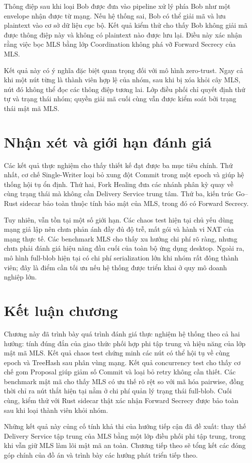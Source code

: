 \documentclass[../DoAn.tex]{subfiles}
\begin{document}
	Thông điệp sau khi loại Bob được đưa vào pipeline xử lý phía Bob như một envelope nhận được từ mạng. Nếu hệ thống sai, Bob có thể giải mã và lưu plaintext vào cơ sở dữ liệu cục bộ. Kết quả kiểm thử cho thấy Bob không giải mã được thông điệp này và không có plaintext nào được lưu lại. Điều này xác nhận rằng việc bọc MLS bằng lớp Coordination không phá vỡ Forward Secrecy của MLS.
	
	Kết quả này có ý nghĩa đặc biệt quan trọng đối với mô hình zero-trust. Ngay cả khi một nút từng là thành viên hợp lệ của nhóm, sau khi bị xóa khỏi cây MLS, nút đó không thể đọc các thông điệp tương lai. Lớp điều phối chỉ quyết định thứ tự và trạng thái nhóm; quyền giải mã cuối cùng vẫn được kiểm soát bởi trạng thái mật mã MLS.
	
	\section{Nhận xét và giới hạn đánh giá}
	\label{sec:nhan_xet_gioi_han}
	
	Các kết quả thực nghiệm cho thấy thiết kế đạt được ba mục tiêu chính. Thứ nhất, cơ chế Single-Writer loại bỏ xung đột Commit trong một epoch và giúp hệ thống hội tụ ổn định. Thứ hai, Fork Healing đưa các nhánh phân kỳ quay về cùng trạng thái mà không cần Delivery Service trung tâm. Thứ ba, kiến trúc Go--Rust sidecar bảo toàn thuộc tính bảo mật của MLS, trong đó có Forward Secrecy.
	
	Tuy nhiên, vẫn tồn tại một số giới hạn. Các chaos test hiện tại chủ yếu dùng mạng giả lập nên chưa phản ánh đầy đủ độ trễ, mất gói và hành vi NAT của mạng thực tế. Các benchmark MLS cho thấy xu hướng chi phí rõ ràng, nhưng chưa phải đánh giá hiệu năng đầu cuối của toàn bộ ứng dụng desktop. Ngoài ra, mô hình full-blob hiện tại có chi phí serialization lớn khi nhóm rất đông thành viên; đây là điểm cần tối ưu nếu hệ thống được triển khai ở quy mô doanh nghiệp lớn.
	
	\section{Kết luận chương}
	\label{sec:ket_luan_chuong_5}
	
	Chương này đã trình bày quá trình đánh giá thực nghiệm hệ thống theo cả hai hướng: tính đúng đắn của giao thức phối hợp phi tập trung và hiệu năng của lớp mật mã MLS. Kết quả chaos test chứng minh các nút có thể hội tụ về cùng epoch và TreeHash sau phân vùng mạng. Kết quả concurrency test cho thấy cơ chế gom Proposal giúp giảm số Commit và loại bỏ retry không cần thiết. Các benchmark mật mã cho thấy MLS có ưu thế rõ rệt so với mã hóa pairwise, đồng thời chỉ ra nút thắt hiện tại nằm ở chi phí quản lý trạng thái full-blob. Cuối cùng, kiểm thử với Rust sidecar thật xác nhận Forward Secrecy được bảo toàn sau khi loại thành viên khỏi nhóm.
	
	Những kết quả này củng cố tính khả thi của hướng tiếp cận đã đề xuất: thay thế Delivery Service tập trung của MLS bằng một lớp điều phối phi tập trung, trong khi vẫn giữ MLS làm lõi mật mã an toàn. Chương tiếp theo sẽ tổng kết các đóng góp chính của đồ án và trình bày các hướng phát triển tiếp theo.
	
\end{document}

